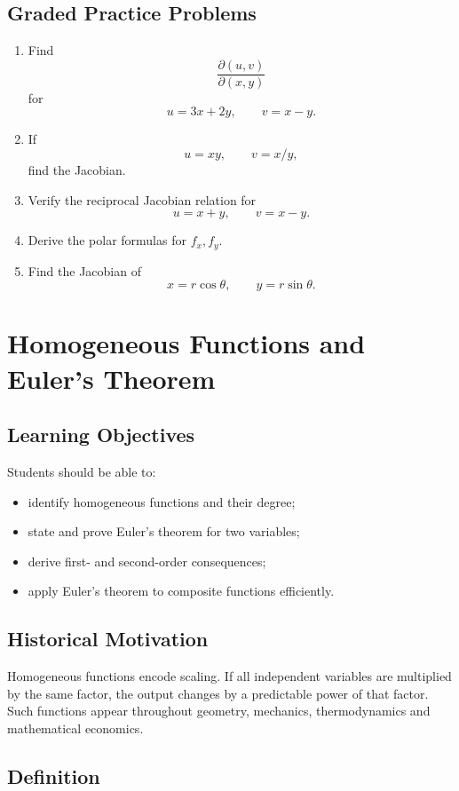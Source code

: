 \documentclass[11pt,oneside]{book}
\theoremstyle{studentthm}
\theoremstyle{definition}
\begin{document}
\section{Graded Practice Problems}
\begin{enumerate}
\item Find
\[
\frac{\partial(u,v)}{\partial(x,y)}
\]
for
\[
u=3x+2y,\qquad v=x-y.
\]
\item If
\[
u=xy,\qquad v=x/y,
\]
find the Jacobian.
\item Verify the reciprocal Jacobian relation for
\[
u=x+y,\qquad v=x-y.
\]
\item Derive the polar formulas for \(f_x,f_y\).
\item Find the Jacobian of
\[
x=r\cos\theta,\qquad y=r\sin\theta.
\]
\end{enumerate}

\chapter{Homogeneous Functions and Euler's Theorem}

\section*{Learning Objectives}
Students should be able to:
\begin{itemize}
\item identify homogeneous functions and their degree;
\item state and prove Euler's theorem for two variables;
\item derive first- and second-order consequences;
\item apply Euler's theorem to composite functions efficiently.
\end{itemize}

\section*{Historical Motivation}

Homogeneous functions encode scaling. If all independent variables are
multiplied by the same factor, the output changes by a predictable
power of that factor. Such functions appear throughout geometry,
mechanics, thermodynamics and mathematical economics.

\section{Definition}
\end{document}
